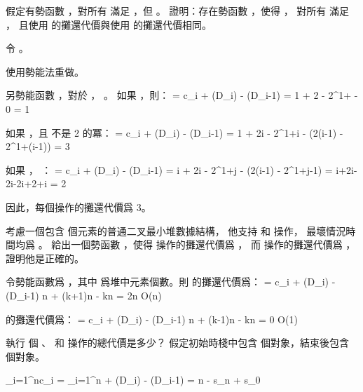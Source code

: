 \startsection[
  title={The potential method},
]

\startEXERCISE
假定有勢函數 \m{\Phi}，對所有  滿足 ，但 。
證明：存在勢函數 ，使得 ，
對所有  滿足 ，
且使用  的攤還代價與使用 \m{\Phi} 的攤還代價相同。
\stopEXERCISE

\startANSWER
令 。
\stopANSWER

\startEXERCISE
使用勢能法重做。
\stopEXERCISE

\startANSWER
另勢能函數 ，對於 ， 。
如果 ，則：
\startformula
{} = c_i + \Phi(D_i) - \Phi(D_{i-1}) = 1 + 2 - 2^{1+\lceil {}\rceil} - 0 = 1
\stopformula

如果 ，且  不是 2 的冪：
\startformula
{} = c_i + \Phi(D_i) - \Phi(D_{i-1}) = 1 + 2i - 2^{1+\lceil \lg i\rceil} - (2(i-1) - 2^{1+\lceil \lg (i-1)\rceil}) = 3
\stopformula

如果 ， ：
\startformula
{} = c_i + \Phi(D_i) - \Phi(D_{i-1}) = i + 2i - 2^{1+j} - (2(i-1) - 2^{1+j-1}) = i+2i-2i-2i+2+i = 2
\stopformula

因此，每個操作的攤還代價爲 3。
\stopANSWER

\startEXERCISE
考慮一個包含  個元素的普通二叉最小堆數據結構，
他支持  和  操作，
最壞情況時間均爲 。
給出一個勢函數 \m{\Phi}，使得  操作的攤還代價爲 ，
而  操作的攤還代價爲 ，證明他是正確的。
\stopEXERCISE

\startANSWER
令勢能函數爲 ，其中  爲堆中元素個數。則  的攤還代價爲：
\startformula
{} = c_i + \Phi(D_i) - \Phi(D_{i-1}) \le \lg n + (k+1)\lg n - k\lg n = 2\lg n \in O(\lg n)
\stopformula

 的攤還代價爲：
\startformula
{} = c_i + \Phi(D_i) - \Phi(D_{i-1}) \le \lg n + (k-1)\lg n - k\lg n = 0 \in O(1)
\stopformula
\stopANSWER

\startEXERCISE
執行  個 、  和  操作的總代價是多少？
假定初始時棧中包含  個對象，結束後包含  個對象。
\stopEXERCISE

\startANSWER
\startformula\startmathalignment
\NC \sum_{i=1}^{n}c_i \NC = \sum_{i=1}^{n} + \Phi(D_i) - \Phi(D_{i-1}) \NR
\NC \NC = n - s_n + s_0 \NR
\stopmathalignment\stopformula
\stopANSWER

